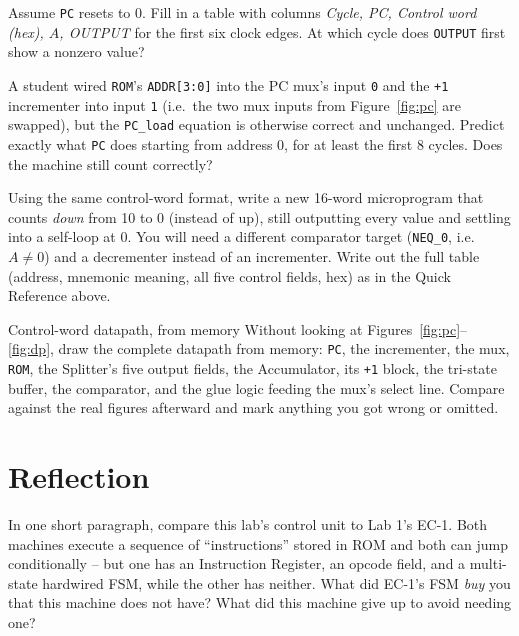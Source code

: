 \documentclass[11pt]{article}
\begin{document}
\takehomebanner

\begin{trace}
Assume \texttt{PC} resets to 0. Fill in a table with columns \emph{Cycle, PC,
Control word (hex), $A$, OUTPUT} for the first six clock edges. At which cycle
does \texttt{OUTPUT} first show a nonzero value?
\end{trace}

\begin{bug}
A student wired \texttt{ROM}'s \texttt{ADDR[3:0]} into the PC mux's input
\texttt{0} and the \texttt{+1} incrementer into input \texttt{1} (i.e.\ the two
mux inputs from Figure~\ref{fig:pc} are swapped), but the \texttt{PC\_load}
equation is otherwise correct and unchanged. Predict exactly what \texttt{PC}
does starting from address 0, for at least the first 8 cycles. Does the machine
still count correctly?
\end{bug}

\begin{writecode}
Using the same control-word format, write a new 16-word microprogram that counts
\emph{down} from 10 to 0 (instead of up), still outputting every value and
settling into a self-loop at 0. You will need a different comparator target
(\texttt{NEQ\_0}, i.e.\ $A \neq 0$) and a decrementer instead of an incrementer.
Write out the full table (address, mnemonic meaning, all five control fields,
hex) as in the Quick Reference above.
\end{writecode}

\begin{drawex}{Control-word datapath, from memory}
Without looking at Figures~\ref{fig:pc}--\ref{fig:dp}, draw the complete datapath
from memory: \texttt{PC}, the incrementer, the mux, \texttt{ROM}, the Splitter's
five output fields, the Accumulator, its \texttt{+1} block, the tri-state buffer,
the comparator, and the glue logic feeding the mux's select line. Compare against
the real figures afterward and mark anything you got wrong or omitted.
\end{drawex}

\section*{Reflection}

In one short paragraph, compare this lab's control unit to Lab 1's EC-1. Both
machines execute a sequence of ``instructions'' stored in ROM and both can jump
conditionally -- but one has an Instruction Register, an opcode field, and a
multi-state hardwired FSM, while the other has neither. What did EC-1's FSM
\emph{buy} you that this machine does not have? What did this machine give up to
avoid needing one?
\end{document}
